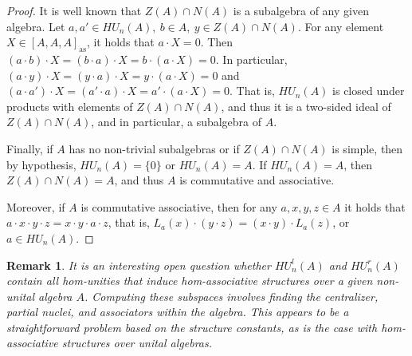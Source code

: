 \documentclass[12pt]{article}
\newtheorem{remark}[theorem]{Remark}
\begin{document}
\begin{proof}
			It is well known that $Z(A)\cap N(A)$ is a subalgebra of any given algebra. Let $a,a'\in HU_n(A),\ b\in A,\ y\in Z(A)\cap N(A)$.
			For any element $X\in [A,A,A]_{\mathrm{as}}$, it holds that $a\cdot X=0$. Then $(a\cdot b)\cdot X=(b\cdot a)\cdot X=b\cdot (a\cdot X)=0$. In particular, $(a\cdot y)\cdot X=(y\cdot a)\cdot X=y\cdot (a\cdot X)=0$ and $(a\cdot a')\cdot X=(a'\cdot a)\cdot X=a'\cdot (a\cdot X)=0$. That is, $HU_n(A)$ is closed under products with elements of $Z(A)\cap N(A)$, and thus it is a two-sided ideal of $Z(A)\cap N(A)$, and in particular, a subalgebra of $A$.
			
			
			Finally, if $A$ has no non-trivial subalgebras or if $Z(A)\cap N(A)$ is simple, then by hypothesis, $HU_n(A)=\{0\}$ or $HU_n(A)=A$. If $HU_n(A)=A$, then $Z(A)\cap N(A)=A$, and thus $A$ is commutative and associative.
			
			Moreover, if $A$ is commutative associative, then for any $a,x,y,z\in A$ it holds that $a\cdot x\cdot y\cdot z=x\cdot y\cdot a\cdot z$, that is, $L_a(x)\cdot(y\cdot z)=(x\cdot y)\cdot L_a(z)$, or $a\in HU_n(A)$.
			
		\end{proof}
		\begin{remark}
			It is an interesting open question whether $HU_n^l(A)$ and $HU_n^r(A)$ contain all hom-unities that induce hom-associative structures over a given non-unital algebra $A$. Computing these subspaces involves finding the centralizer, partial nuclei, and associators within the algebra. This appears to be a straightforward problem based on the structure constants, as is the case with hom-associative structures over unital algebras.
		\end{remark}
		
\end{document}
